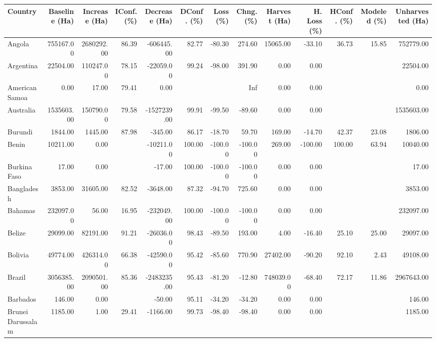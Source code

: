 \begin{table}[ht]
\centering
\begin{tabular}{lrrrrrrrrrrrr}
  \hline
Country & Baseline (Ha) & Increase (Ha) & IConf. (\%) & Decrease (Ha) & DConf. (\%) & Loss (\%) & Chng. (\%) & Harvest (Ha) & H. Loss (\%) & HConf. (\%) & Modeled (\%) & Unharvested (Ha) \\ 
  \hline
Angola & 755167.00 & 2680292.00 & 86.39 & -606445.00 & 82.77 & -80.30 & 274.60 & 15065.00 & -33.10 & 36.73 & 15.85 & 752779.00 \\ 
  Argentina & 22504.00 & 110247.00 & 78.15 & -22059.00 & 99.24 & -98.00 & 391.90 & 0.00 & 0.00 &  &  & 22504.00 \\ 
  American Samoa & 0.00 & 17.00 & 79.41 & 0.00 &  &  & Inf & 0.00 & 0.00 &  &  & 0.00 \\ 
  Australia & 1535603.00 & 150790.00 & 79.58 & -1527239.00 & 99.91 & -99.50 & -89.60 & 0.00 & 0.00 &  &  & 1535603.00 \\ 
  Burundi & 1844.00 & 1445.00 & 87.98 & -345.00 & 86.17 & -18.70 & 59.70 & 169.00 & -14.70 & 42.37 & 23.08 & 1806.00 \\ 
  Benin & 10211.00 & 0.00 &  & -10211.00 & 100.00 & -100.00 & -100.00 & 269.00 & -100.00 & 100.00 & 63.94 & 10040.00 \\ 
  Burkina Faso & 17.00 & 0.00 &  & -17.00 & 100.00 & -100.00 & -100.00 & 0.00 & 0.00 &  &  & 17.00 \\ 
  Bangladesh & 3853.00 & 31605.00 & 82.52 & -3648.00 & 87.32 & -94.70 & 725.60 & 0.00 & 0.00 &  &  & 3853.00 \\ 
  Bahamas & 232097.00 & 56.00 & 16.95 & -232049.00 & 100.00 & -100.00 & -100.00 & 0.00 & 0.00 &  &  & 232097.00 \\ 
  Belize & 29099.00 & 82191.00 & 91.21 & -26036.00 & 98.43 & -89.50 & 193.00 & 4.00 & -16.40 & 25.10 & 25.00 & 29097.00 \\ 
  Bolivia & 49774.00 & 426314.00 & 66.38 & -42590.00 & 95.42 & -85.60 & 770.90 & 27402.00 & -90.20 & 92.10 & 2.43 & 49108.00 \\ 
  Brazil & 3056385.00 & 2090501.00 & 85.36 & -2483235.00 & 95.43 & -81.20 & -12.80 & 748039.00 & -68.40 & 72.17 & 11.86 & 2967643.00 \\ 
  Barbados & 146.00 & 0.00 &  & -50.00 & 95.11 & -34.20 & -34.20 & 0.00 & 0.00 &  &  & 146.00 \\ 
  Brunei Darussalam & 1185.00 & 1.00 & 29.41 & -1166.00 & 99.73 & -98.40 & -98.40 & 0.00 & 0.00 &  &  & 1185.00 \\ 

\end{tabular}
\end{table}
